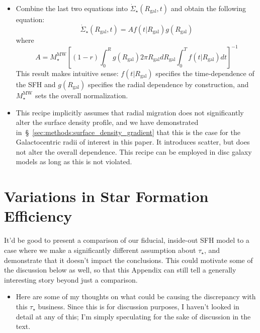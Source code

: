 \documentclass[fleqn, usenatbib]{mnras}
\begin{document}
\begin{appendices}
\begin{itemize}
	\item Combine the last two equations into 
	$\dot{\Sigma}_\star(R_\text{gal}, t)$ and obtain the following equation: 
	\begin{equation} 
	\dot{\Sigma}_\star(R_\text{gal}, t) = A f(t|R_\text{gal}) g(R_\text{gal}) 
	\end{equation} 
	where 
	\begin{equation} 
	A = M_\star^\text{MW}\left[(1 - r)\int_0^R g(R_\text{gal}) 2\pi 
		R_\text{gal} dR_\text{gal} \int_0^T f(t|R_\text{gal}) dt\right]^{-1} 
	\end{equation} 
	This result makes intuitive sense: $f(t|R_\text{gal})$ specifies the 
	time-dependence of the SFH and $g(R_\text{gal})$ specifies the radial 
	dependence by construction, and $M_\star^\text{MW}$ sets the overall 
	normalization. 

	\item This recipe implicitly assumes that radial migration does not 
	significantly alter the surface density profile, and we have demonstrated 
	in~\S~\ref{sec:methods:surface_density_gradient} that this is the case for 
	the Galactocentric radii of interest in this paper. It introduces scatter, 
	but does not alter the overall dependence. This recipe can be employed in 
	disc galaxy models as long as this is not violated. 
\end{itemize} 

\newpage 
\section{Variations in Star Formation Efficiency} 
\label{sec:sfe_variations} 
{\color{red} It'd be good to present a comparison of our fiducial, inside-out 
SFH model to a case where we make a significantly different assumption about 
$\tau_\star$, and demonstrate that it doesn't impact the conclusions. This 
could motivate some of the discussion below as well, so that this Appendix can 
still tell a generally interesting story beyond just a comparison. }

\begin{itemize} 
	\item {\color{red} Here are some of my thoughts on what could be 
	causing the discrepancy with this $\tau_\star$ business. Since 
	this is for discussion purposes, I haven't looked in detail at any 
	of this; I'm simply speculating for the sake of discussion in the 
	text. } 


\end{itemize}
\end{appendices}
\end{document}
